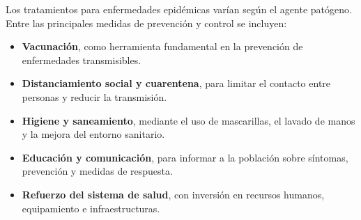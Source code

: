 Los tratamientos para enfermedades epidémicas varían según el agente patógeno. Entre las principales medidas de prevención y control se incluyen:
\begin{itemize}
  \item \textbf{Vacunación}, como herramienta fundamental en la prevención de enfermedades transmisibles.
  \item \textbf{Distanciamiento social y cuarentena}, para limitar el contacto entre personas y reducir la transmisión.
  \item \textbf{Higiene y saneamiento}, mediante el uso de mascarillas, el lavado de manos y la mejora del entorno sanitario.
  \item \textbf{Educación y comunicación}, para informar a la población sobre síntomas, prevención y medidas de respuesta.
  \item \textbf{Refuerzo del sistema de salud}, con inversión en recursos humanos, equipamiento e infraestructuras.
\end{itemize}


